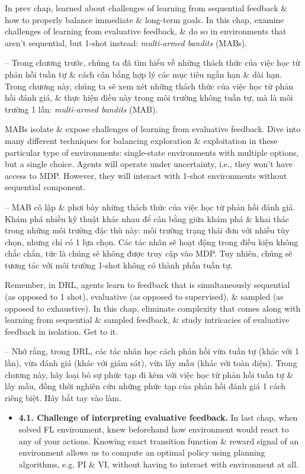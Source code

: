 \documentclass{article}
\begin{document}
\begin{itemize}
    In prev chap, learned about challenges of learning from sequential feedback \& how to properly balance immediate \& long-term goals. In this chap, examine challenges of learning from evaluative feedback, \& do so in environments that aren't sequential, but 1-shot instead: {\it multi-armed bandits} (MABs).

    -- Trong chương trước, chúng ta đã tìm hiểu về những thách thức của việc học từ phản hồi tuần tự \& cách cân bằng hợp lý các mục tiêu ngắn hạn \& dài hạn. Trong chương này, chúng ta sẽ xem xét những thách thức của việc học từ phản hồi đánh giá, \& thực hiện điều này trong môi trường không tuần tự, mà là môi trường 1 lần: {\it multi-armed bandits} (MAB).

    MABs isolate \& expose challenges of learning from evaluative feedback. Dive into many different techniques for balancing exploration \& exploitation in these particular type of environments: single-state environments with multiple options, but a single choice. Agents will operate under uncertainty, i.e., they won't have access to MDP. However, they will interact with 1-shot environments without sequential component.

    -- MAB cô lập \& phơi bày những thách thức của việc học từ phản hồi đánh giá. Khám phá nhiều kỹ thuật khác nhau để cân bằng giữa khám phá \& khai thác trong những môi trường đặc thù này: môi trường trạng thái đơn với nhiều tùy chọn, nhưng chỉ có 1 lựa chọn. Các tác nhân sẽ hoạt động trong điều kiện không chắc chắn, tức là chúng sẽ không được truy cập vào MDP. Tuy nhiên, chúng sẽ tương tác với môi trường 1-shot không có thành phần tuần tự.

    Remember, in DRL, agents learn to feedback that is simultaneously sequential (as opposed to 1 shot), evaluative (as opposed to supervised), \& sampled (as opposed to exhaustive). In this chap, eliminate complexity that comes along with learning from sequential \& sampled feedback, \& study intricacies of evaluative feedback in isolation. Get to it.

    -- Nhớ rằng, trong DRL, các tác nhân học cách phản hồi vừa tuần tự (khác với 1 lần), vừa đánh giá (khác với giám sát), vừa lấy mẫu (khác với toàn diện). Trong chương này, hãy loại bỏ sự phức tạp đi kèm với việc học từ phản hồi tuần tự \& lấy mẫu, đồng thời nghiên cứu những phức tạp của phản hồi đánh giá 1 cách riêng biệt. Hãy bắt tay vào làm.
    \begin{itemize}
        \item {\bf4.1. Challenge of interpreting evaluative feedback.} In last chap, when solved FL environment, knew beforehand how environment would react to any of your actions. Knowing exact transition function \& reward signal of an environment allows us to compute an optimal policy using planning algorithms, e.g. PI \& VI, without having to interact with environment at all.


\end{itemize}
\end{itemize}
\end{document}
